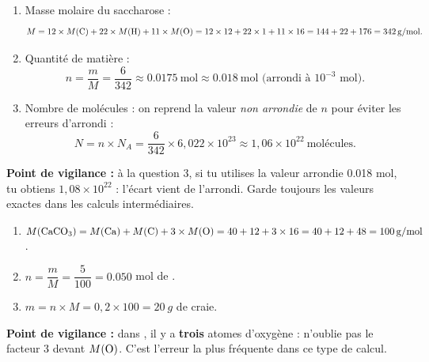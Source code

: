 \documentclass[11pt]{article}
\begin{document}
\begin{corrige}
\begin{enumerate}
\item Masse molaire du saccharose  :
\[ M = 12\times M(\ce{C}) + 22\times M(\ce{H}) + 11\times M(\ce{O}) = 12\times 12 + 22\times 1 + 11\times 16 = 144 + 22 + 176 = \SI{342}{g/mol}. \]
\item Quantité de matière :
\[ n = \dfrac{m}{M} = \dfrac{6}{342} \approx \num{0,0175}\ \text{mol} \approx \num{0,018}\ \text{mol (arrondi à } 10^{-3}\text{ mol)}. \]
\item Nombre de molécules : on reprend la valeur \emph{non arrondie} de $n$ pour éviter les erreurs d'arrondi :
\[ N = n\times N_A = \frac{6}{342}\times 6,022\times 10^{23} \approx 1,06\times 10^{22}\ \text{molécules}. \]
\end{enumerate}
\textbf{Point de vigilance :} à la question 3, si tu utilises la valeur arrondie \num{0,018} mol, tu obtiens $1,08\times 10^{22}$ : l'écart vient de l'arrondi. Garde toujours les valeurs exactes dans les calculs intermédiaires.
\end{corrige}

\begin{corrige}
\begin{enumerate}
\item $M(\ce{CaCO3}) = M(\ce{Ca}) + M(\ce{C}) + 3\times M(\ce{O}) = 40 + 12 + 3\times 16 = 40 + 12 + 48 = \SI{100}{g/mol}$.
\item $n = \dfrac{m}{M} = \dfrac{5}{100} = \num{0,050}$ mol de .
\item $m = n\times M = 0,2\times 100 = \SI{20}{g}$ de craie.
\end{enumerate}
\textbf{Point de vigilance :} dans , il y a \textbf{trois} atomes d'oxygène : n'oublie pas le facteur 3 devant $M(\ce{O})$. C'est l'erreur la plus fréquente dans ce type de calcul.
\end{corrige}
\end{document}
